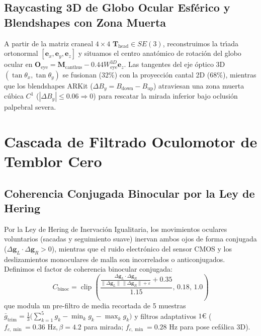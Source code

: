 \documentclass[twocolumn,10pt]{article}
\begin{document}
\subsection{Raycasting 3D de Globo Ocular Esf\'erico y Blendshapes con Zona Muerta}
A partir de la matriz craneal $4 \times 4$ $\mathbf{T}_{\text{head}} \in SE(3)$, reconstruimos la tr\'{\i}ada ortonormal $[\mathbf{e}_x, \mathbf{e}_y, \mathbf{e}_z]$ y situamos el centro anat\'omico de rotaci\'on del globo ocular en $\mathbf{O}_{\text{eye}} = \mathbf{M}_{\text{canthus}} - 0.44 W_{\text{eye}}^{3D} \mathbf{e}_z$. Las tangentes del eje \'optico 3D $(\tan\theta_x, \tan\theta_y)$ se fusionan ($32\%$) con la proyecci\'on cantal 2D ($68\%$), mientras que los blendshapes ARKit ($\Delta B_y = B_{\text{down}} - B_{\text{up}}$) atraviesan una zona muerta c\'ubica $C^1$ ($|\Delta B_y| \le 0.06 \Rightarrow 0$) para rescatar la mirada inferior bajo oclusi\'on palpebral severa.

\section{Cascada de Filtrado Oculomotor de Temblor Cero}
\label{sec:filtering}

\subsection{Coherencia Conjugada Binocular por la Ley de Hering}
Por la Ley de Hering de Inervaci\'on Igualitaria, los movimientos oculares voluntarios (sacadas y seguimiento suave) inervan ambos ojos de forma conjugada ($\Delta\mathbf{g}_L \cdot \Delta\mathbf{g}_R > 0$), mientras que el ruido electr\'onico del sensor CMOS y los deslizamientos monoculares de malla son incorrelados o anticonjugados. Definimos el factor de coherencia binocular conjugada:
\begin{equation}
C_{\text{binoc}} = \operatorname{clip}\!\left(\frac{\frac{\Delta\mathbf{g}_L \cdot \Delta\mathbf{g}_R}{\|\Delta\mathbf{g}_L\|\,\|\Delta\mathbf{g}_R\| + \varepsilon} + 0.35}{1.15},\, 0.18,\, 1.0\right)
\end{equation}
que modula un pre-filtro de media recortada de 5 muestras $\bar{g}_{\text{trim}} = \frac{1}{3}\big(\sum_{k=1}^5 g_k - \min_k g_k - \max_k g_k\big)$ y filtros adaptativos $1\text{€}$ ($f_{c,\min} = 0.36\text{ Hz}, \beta = 4.2$ para mirada; $f_{c,\min} = 0.28\text{ Hz}$ para pose cef\'alica 3D).
\end{document}
